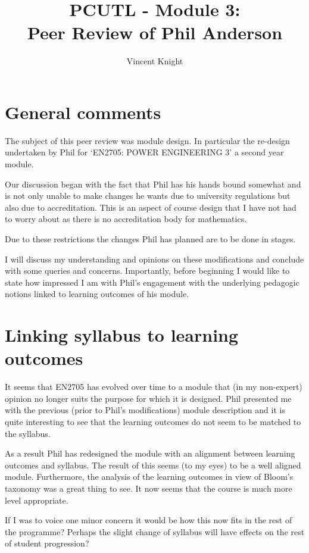 \documentclass{article}
\title{PCUTL - Module 3:\\ Peer Review of Phil Anderson}
\author{Vincent Knight}
\date{}
\begin{document}
\maketitle

\section{General comments}

The subject of this peer review was module design. In particular the re-design undertaken by Phil for `EN2705: POWER ENGINEERING 3' a second year module.

Our discussion began with the fact that Phil has his hands bound somewhat and is not only unable to make changes he wants due to university regulations but also due to accreditation. This is an aspect of course design that I have not had to worry about as there is no accreditation body for mathematics.

Due to these restrictions the changes Phil has planned are to be done in stages.

I will discuss my understanding and opinions on these modifications and conclude with some queries and concerns. Importantly, before beginning I would like to state how impressed I am with Phil's engagement with the underlying pedagogic notions linked to learning outcomes of his module.

\section{Linking syllabus to learning outcomes}

It seems that EN2705 has evolved over time to a module that (in my non-expert) opinion no longer suits the purpose for which it is designed. Phil presented me with the previous (prior to Phil's modifications) module description and it is quite interesting to see that the learning outcomes do not seem to be matched to the syllabus.

As a result Phil has redesigned the module with an alignment between learning outcomes and syllabus. The result of this seems (to my eyes) to be a well aligned module. Furthermore, the analysis of the learning outcomes in view of Bloom's taxonomy was a great thing to see. It now seems that the course is much more level appropriate.

If I was to voice one minor concern it would be how this now fits in the rest of the programme? Perhaps the slight change of syllabus will have effects on the rest of student progression?
\end{document}
